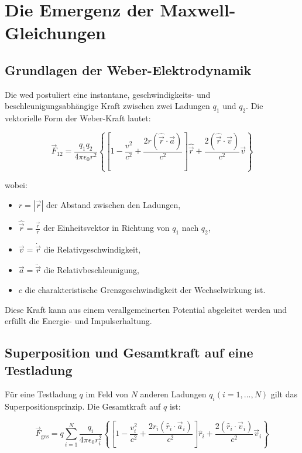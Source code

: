 \chapter{Die Emergenz der Maxwell-Gleichungen}
\label{ch:maxwell}
\section{Grundlagen der Weber-Elektrodynamik}
\label{sec:grundlagen}
Die \gls{wed} postuliert eine instantane, geschwindigkeits- und beschleunigungsabhängige Kraft zwischen zwei Ladungen $q_1$ und $q_2$. Die vektorielle Form der Weber-Kraft lautet:

\begin{equation}
    \vec{F}_{12} = \frac{q_1 q_2}{4\pi\epsilon_0 r^2} \left\{ \left[ 1 - \frac{v^2}{c^2} + \frac{2r(\hat{\vec{r}}\cdot\vec{a})}{c^2} \right] \hat{\vec{r}} + \frac{2(\hat{\vec{r}}\cdot\vec{v})}{c^2} \vec{v} \right\}
\end{equation}

wobei:

\begin{itemize}
    \item $r = \left| \vec{r} \right|$ der Abstand zwischen den Ladungen,
    \item $\hat{\vec{r}} = \frac{\vec{r}}{r}$ der Einheitsvektor in Richtung von $q_1$ nach $q_2$,
    \item $\vec{v} = \dot{\vec{r}}$ die Relativgeschwindigkeit,
    \item $\vec{a} = \ddot{\vec{r}}$ die Relativbeschleunigung,
    \item $c$ die charakteristische Grenzgeschwindigkeit der Wechselwirkung ist.
\end{itemize}

Diese Kraft kann aus einem verallgemeinerten Potential abgeleitet werden und erfüllt die Energie- und Impulserhaltung.

\section{Superposition und Gesamtkraft auf eine Testladung}
Für eine Testladung $q$ im Feld von $N$ anderen Ladungen $q_i (i = 1,...,N)$ gilt das Superpositionsprinzip. Die Gesamtkraft auf $q$ ist:

\begin{equation}
    \label{eq:gesamtkraft}
    \vec{F}_{\text{ges}} = q \sum_{i=1}^N \frac{q_i}{4\pi\epsilon_0 r_i^2} \left\{ \left[ 1 - \frac{v_i^2}{c^2} + \frac{2r_i(\hat{r}_i\cdot\vec{a}_i)}{c^2} \right] \hat{r}_i + \frac{2(\hat{r}_i\cdot\vec{v}_i)}{c^2} \vec{v}_i \right\}
\end{equation}

